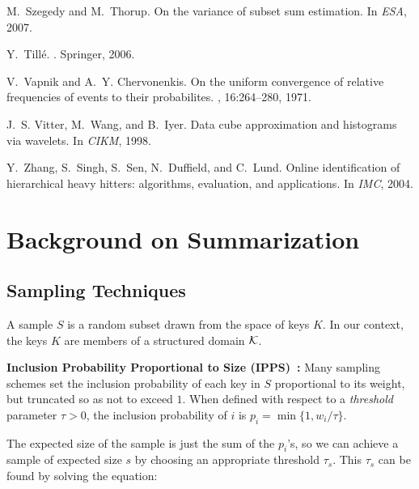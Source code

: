 \documentclass[11pt]{article}
\begin{document}
{\begin{thebibliography}{10}
M.~Szegedy and M.~Thorup.
\newblock On the variance of subset sum estimation.
\newblock In {\em  ESA}, 2007.

Y.~Till\'e.
.
\newblock Springer, 2006.

V.~Vapnik and A.~Y. Chervonenkis.
\newblock On the uniform convergence of relative frequencies of events to their
  probabilites.
, 16:264--280, 1971.

J.~S. Vitter, M.~Wang, and B.~Iyer.
\newblock Data cube approximation and histograms via wavelets.
\newblock In {\em CIKM}, 1998.

Y.~Zhang, S.~Singh, S.~Sen, N.~Duffield, and C.~Lund.
\newblock Online identification of hierarchical heavy hitters: algorithms,
  evaluation, and applications.
\newblock In {\em IMC}, 2004.

\end{thebibliography}}

\newpage
\appendix

\section{Background on Summarization} \label{prelim:sec}

\subsection*{Sampling Techniques}
A sample $S$ is a random subset drawn from the space of keys $K$. 
In our context, the keys $K$ are members of a structured domain $\mathcal{K}$.


\noindent
{\bf Inclusion Probability Proportional to Size (IPPS)~\cite{Hajekbook1981}:}
Many sampling schemes set the inclusion
probability of each key in $S$  proportional to its weight, but truncated
so as not to exceed $1$.  
When defined with respect to a {\em threshold} 
parameter $\tau >0$, the inclusion probability 
of $i$ is $p_i=\min\{1,w_i/\tau\}$.  

The expected size of the sample is just the sum of the $p_i$'s, so we
can achieve a sample of expected size $s$ by choosing an appropriate
threshold $\tau_s$. 
This $\tau_s$ can be found by solving the equation: 
\end{document}
